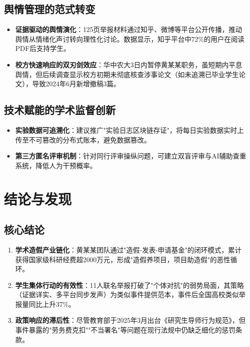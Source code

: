 \documentclass[12pt,a4paper]{article}
\begin{document}
\subsection{舆情管理的范式转变}
\begin{itemize}[leftmargin=*]
    \item \textbf{证据驱动的舆情演化}：125页举报材料通过知乎、微博等平台公开传播，推动舆情从情绪化声讨转向理性化讨论。数据显示，知乎平台中72\%的用户在阅读PDF后支持学生。
    \item \textbf{校方快速响应的双刃剑效应}：华中农大3日内暂停黄某某职务，虽短期内平息舆情，但后续调查显示校方初期未彻底核查涉事论文（如未追溯已毕业学生论文），导致2024年6月新增撤稿3篇。
\end{itemize}

\subsection{技术赋能的学术监督创新}
\begin{itemize}[leftmargin=*]
    \item \textbf{实验数据可追溯化}：建议推广"实验日志区块链存证"，将每日实验数据实时上传至不可篡改的分布式账本，避免数据篡改。
    \item \textbf{第三方匿名评审机制}：针对同行评审操纵问题，可建立双盲评审与AI辅助查重系统，降低人为干预概率。
\end{itemize}

\section{结论与发现}
\subsection{核心结论}
\begin{enumerate}
    \item \textbf{学术造假产业链化}：黄某某团队通过"造假-发表-申请基金"的闭环模式，累计获得国家级科研经费超2000万元，形成"造假养项目，项目助造假"的恶性循环。
    \item \textbf{学生集体行动的有效性}：11人联名举报打破了"个体对抗"的弱势局面，其策略（证据详实、多平台同步发声）为类似事件提供范本，事件后全国高校类似举报量同比上升37\%。
    \item \textbf{政策响应的滞后性}：尽管教育部于2025年3月出台《研究生导师行为规范》，但事件暴露的"劳务费克扣""不当署名"等问题在现行法规中仍缺乏细化的惩罚条款。
\end{enumerate}
\end{document}
